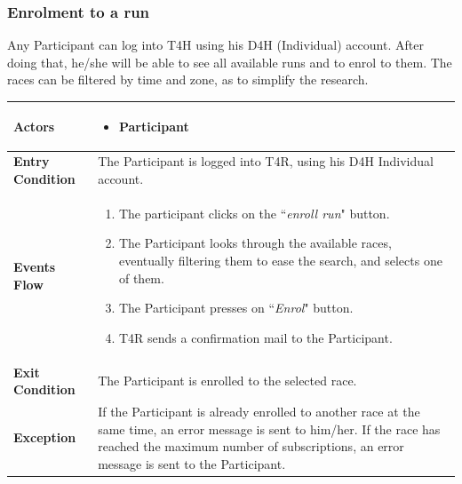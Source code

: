         \subsubsection{Enrolment to a run}
            Any Participant can log into T4H using his D4H (Individual) account. After doing that, he/she will be able to see all available runs and to enrol to them. The races can be filtered by time and zone, as to simplify the research.
            
            \begin{table}[H]
            	\centering
                
                \begin{tabular}{|p{3cm}|p{8.2cm}|}
                    \hline
                    \textbf{Actors} & \begin{itemize}
                        \item Participant
                    \end{itemize} \\
                     \hline
                    \textbf{Entry Condition} & The Participant is logged into T4R, using his D4H Individual account. \\
                     \hline
                    \textbf{Events Flow} & \begin{enumerate}
                                                \item The participant clicks on the ``\emph{enroll run}" button.
                                                \item The Participant looks through the available races, eventually filtering them to ease the search, and selects one of them.
                                                \item The Participant presses on ``\emph{Enrol}" button.
                                                \item T4R sends a confirmation mail to the Participant.
                                            \end{enumerate}\\
                     \hline
                    \textbf{Exit Condition} & The Participant is enrolled to the selected race.\\
                     \hline
                    \textbf{Exception} & If the Participant is already enrolled to another race at the same time, an                          error message is sent to him/her. \newline
                                         If the race has reached the maximum number of subscriptions, an error message is sent to the Participant. \\
                     \hline
                \end{tabular}  
            \end{table}            
            
